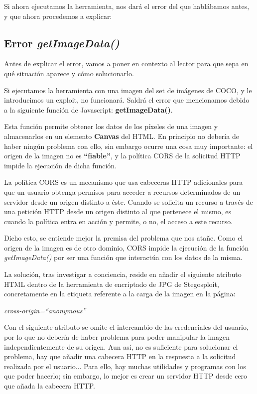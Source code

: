 Si ahora ejecutamos la herramienta, nos dará el error del que hablábamos antes, y que ahora procedemos a explicar:

\subsection{Error \textit{getImageData()}}

Antes de explicar el error, vamos a poner en contexto al lector para que sepa en qué situación aparece y cómo solucionarlo.


Si ejecutamos la herramienta con una imagen del set de imágenes de COCO, y le introducimos un exploit, no funcionará. Saldrá el error que mencionamos debido a la siguiente función de Javascript: \textbf{getImageData()}.

Esta función permite obtener los datos de los píxeles de una imagen y almacenarlos en un elemento \textbf{Canvas} del HTML. En principio no debería de haber ningún problema con ello, sin embargo ocurre una cosa muy importante: el origen de la imagen no es \textbf{``fiable''}, y la política \ac{CORS} de la solicitud HTTP impide la ejecución de dicha función. %

La política \ac{CORS} es un mecanismo que usa cabeceras HTTP adicionales para que un usuario obtenga permisos para acceder a recursos determinados de un servidor desde un origen distinto a éste. Cuando se solicita un recurso a través de una petición HTTP desde un origen distinto al que pertenece el mismo, es cuando la política entra en acción y permite, o no, el acceso a este recurso. %

Dicho esto, se entiende mejor la premisa del problema que nos atañe. Como el origen de la imagen es de otro dominio, \ac{CORS} impide la ejecución de la función \textit{getImageData()} por ser una función que interactúa con los datos de la misma.

La solución, tras investigar a conciencia, reside en añadir el siguiente atributo HTML dentro de la herramienta de encriptado de JPG de Stegosploit, concretamente en la etiqueta referente a la carga de la imagen en la página: %

\begin{center}
\textit{cross-origin=``anonymous''}
\end{center}

Con el siguiente atributo se omite el intercambio de las credenciales del usuario, por lo que no debería de haber problema para poder manipular la imagen independientemente de su origen. Aun así, no es suficiente para solucionar el problema, hay que añadir una cabecera HTTP en la respuesta a la solicitud realizada por el usuario... Para ello, hay muchas utilidades y programas con los que poder hacerlo; sin embargo, lo mejor es crear un servidor HTTP desde cero que añada la cabecera HTTP.

